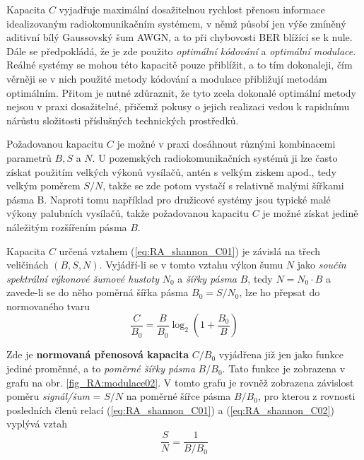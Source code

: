       Kapacita \(C\) vyjadřuje maximální dosažitelnou rychlost přenosu informace idealizovaným 
      radiokomunikačním systémem, v němž působí jen výše zmíněný aditivní bílý Gaussovský šum AWGN, a to při 
      chybovosti BER blížící se k nule. Dále se předpokládá, že je zde použito \emph{optimální kódování} a 
      \emph{optimální modulace}. Reálné systémy se mohou této kapacitě pouze přiblížit, a to tím dokonaleji, 
      čím věrněji se v nich použité metody kódování a modulace přibližují metodám optimálním. Přitom je nutné 
      zdůraznit, že tyto zcela dokonalé optimální metody nejsou v praxi dosažitelné, přičemž pokusy o jejich 
      realizaci vedou k rapidnímu nárůstu složitosti příslušných technických prostředků.
      
      Požadovanou kapacitu \(C\) je možné v praxi dosáhnout různými kombinacemi parametrů \(B, S\) a \(N\). U 
      pozemských radiokomunikačních systémů ji lze často získat použitím velkých výkonů vysílačů, antén s 
      velkým ziskem apod., tedy velkým poměrem \(S/N\), takže se zde potom vystačí s relativně malými šířkami 
      pásma B. Naproti tomu například pro družicové systémy jsou typické malé výkony palubních vysílačů, 
      takže požadovanou kapacitu \(C\) je možné získat jedině náležitým rozšířením pásma \(B\).
      
      Kapacita \(C\) určená vztahem (\ref{eq:RA_shannon_C01}) je závislá na třech veličinách \((B, S, N)\). 
      Vyjádří-li se v tomto vztahu výkon šumu \(N\) jako \emph{součin spektrální výkonové šumové hustoty} 
      \(N_0\) a \emph{šířky pásma} \(B\), tedy \(N = N_0\cdot B\) a zavede-li se do něho poměrná šířka pásma 
      \(B_0 = S/N_0\), lze ho přepsat do normovaného tvaru 
      \begin{equation}\label{eq:RA_shannon_C02}
        \frac{C}{B_0} = \frac{B}{B_0}\log_2\left(1+\frac{B_0}{B}\right)
      \end{equation}
      
      Zde je \textbf{normovaná přenosová kapacita} \(C/B_0\) vyjádřena již jen jako funkce jediné proměnné, a 
      to \emph{poměrné šířky pásma} \(B/B_0\). Tato funkce je zobrazena v grafu na obr. 
      \ref{fig_RA:modulace02}. V tomto grafu je rovněž zobrazena závislost poměru \emph{signál/šum} = \(S/N\) 
      na poměrné šířce pásma \(B/B_0\), pro kterou z rovnosti posledních členů relací 
      (\ref{eq:RA_shannon_C01}) a (\ref{eq:RA_shannon_C02}) vyplývá vztah
      \begin{equation}\label{eq:RA_shannon_C03}
        \frac{S}{N} = \frac{1}{B/B_0}
      \end{equation}      
      
